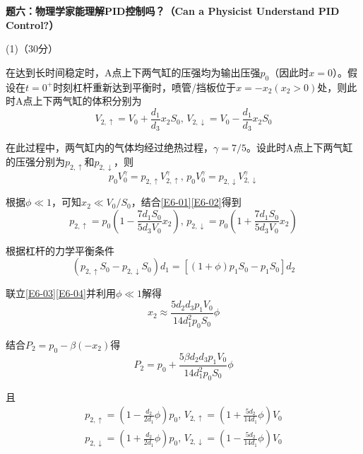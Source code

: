 \documentclass[10pt,a4paper,onecolumn,UTF8]{ctexart}
\begin{document}
	
	\setcounter{equation}{0}
	\newpage
	
	\noindent
	\textbf{题六：物理学家能理解PID控制吗？（Can a Physicist Understand PID Control?）}
	
	(1)（30分）
	
	在达到长时间稳定时，A点上下两气缸的压强均为输出压强$p_0$（因此时$x=0$）。假设在$t=0^+$时刻杠杆重新达到平衡时，喷管/挡板位于$x=-x_2(x_2>0)$处，则此时A点上下两气缸的体积分别为
	\begin{equation}\label{E6-01}
		V_{2,\uparrow}=V_0+\frac{d_1}{d_3}x_2S_0,\,V_{2,\downarrow}=V_0-\frac{d_1}{d_3}x_2S_0
	\end{equation}
	
	在此过程中，两气缸内的气体均经过绝热过程，$\gamma=7/5$。设此时A点上下两气缸的压强分别为$p_{2,\uparrow}$和$p_{2,\downarrow}$，则
	\begin{equation}\label{E6-02}
		p_0V_0^{\gamma}=p_{2,\uparrow}V^{\gamma}_{2,\uparrow},\,p_0V_0^{\gamma}=p_{2,\downarrow}V^{\gamma}_{2,\downarrow}
	\end{equation}
	
	根据$\phi\ll1$，可知$x_2\ll V_0/S_0$，结合\eqref{E6-01}\eqref{E6-02}得到
	\begin{equation}\label{E6-03}
		p_{2,\uparrow}=p_0\left(1-\frac{7d_1S_0}{5d_3V_0}x_2\right),\,p_{2,\downarrow}=p_0\left(1+\frac{7d_1S_0}{5d_3V_0}x_2\right)
	\end{equation}
	
	根据杠杆的力学平衡条件
	\begin{equation}\label{E6-04}
		(p_{2,\uparrow}S_0-p_{2,\downarrow}S_0)d_1=[(1+\phi)p_1S_0-p_1S_0]d_2
	\end{equation}
	
	联立\eqref{E6-03}\eqref{E6-04}并利用$\phi\ll1$解得
	\begin{equation}\label{E6-05}
		x_2\approx\frac{5d_2d_3p_1V_0}{14d_1^2p_0S_0}\phi
	\end{equation}
	
	结合$P_2=p_0-\beta (-x_2)$得
	\begin{equation}\label{E6-06}
		P_2=p_0+\frac{5\beta d_2d_3p_1V_0}{14d_1^2p_0S_0}\phi
	\end{equation}
	
	且
	\begin{equation}\label{E6-07}
		\begin{aligned}
			p_{2,\uparrow}=\left(1-\frac{d_2}{2d_1}\phi\right)p_0,\,V_{2,\uparrow}=\left(1+\frac{5d_2}{14d_1}\phi\right)V_0\\p_{2,\downarrow}=\left(1+\frac{d_2}{2d_1}\phi\right)p_0,\,V_{2,\downarrow}=\left(1-\frac{5d_2}{14d_1}\phi\right)V_0
		\end{aligned}
	\end{equation}
	
\end{document}
